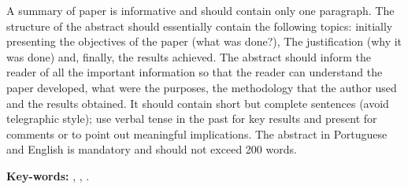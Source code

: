 
A summary of paper is informative and should contain only one paragraph. The structure of the abstract should essentially contain the following topics: initially presenting the objectives of the paper (what was done?), The justification (why it was done) and, finally, the results achieved. The abstract should inform the reader of all the important information so that the reader can understand the paper developed, what were the purposes, the methodology that the author used and the results obtained. It should contain short but complete sentences (avoid telegraphic style); use verbal tense in the past for key results and present for comments or to point out meaningful implications. The abstract in Portuguese and English is mandatory and should not exceed 200 words.

\textbf{Key-words:} , , .